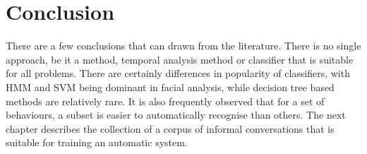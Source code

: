 \section{Conclusion}

There are a few conclusions that can drawn from the literature. There is no single approach, be it a \featureGeneration method, temporal analysis method or classifier that is suitable for all problems. There are certainly differences in popularity of classifiers, with \ac{HMM} and \ac{SVM} being dominant in facial analysis, while decision tree based methods are relatively rare. It is also frequently observed that for a set of behaviours, a subset is easier to automatically recognise than others. The next chapter describes the collection of a corpus of informal conversations that is suitable for training an automatic system.


